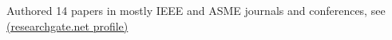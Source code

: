 	\item Authored 14 papers in mostly IEEE and ASME journals and conferences, see \href{https://www.researchgate.net/profile/Kiron_Mateti}{(researchgate.net profile)} 